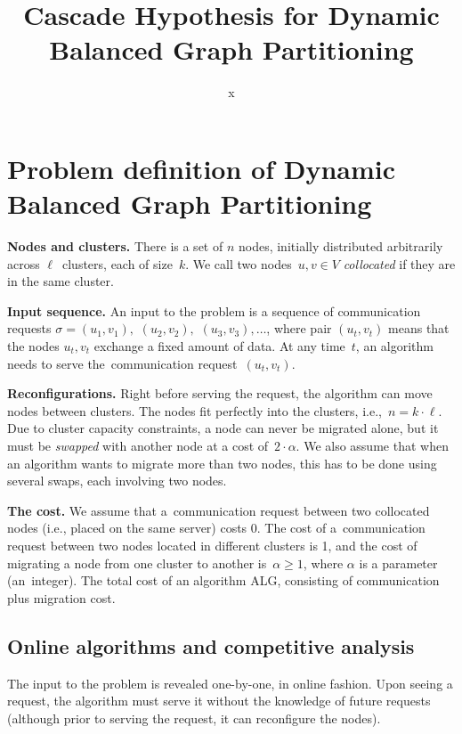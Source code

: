 \documentclass[a4paper,USenglish]{lipics-v2019}
\title{Cascade Hypothesis for Dynamic Balanced Graph Partitioning}
\author{x}{y}{}{}{}
\newcommand{\ALG}{\textsf{ALG}\xspace}
\begin{document}
\maketitle

\section{Problem definition of Dynamic Balanced Graph Partitioning}


\noindent
\textbf{Nodes and clusters.} There is a set of $n$ nodes, initially distributed arbitrarily
across $\ell$~clusters, each of size~$k$. We call two nodes~$u,v\in V$
\emph{collocated} if they are in the same cluster.

\noindent
\textbf{Input sequence.} An input to the problem is a sequence of communication requests $\sigma =
(u_1,v_1),$ $(u_2,v_2),$ $(u_3,v_3), \ldots$, where pair $(u_t,v_t)$ means that
the nodes $u_t,v_t$ exchange a fixed amount of data. At any time~$t
$, an algorithm needs to serve the~communication
request~$(u_t,v_t)$.


\noindent
\textbf{Reconfigurations.} Right before serving the request, the algorithm
can move nodes between clusters.
The nodes fit perfectly into the clusters,
i.e.,~$n=k\cdot \ell$. Due to cluster capacity
constraints, a node can never be migrated alone, but it must be \emph{swapped}
with another node at a cost of~$2 \cdot \alpha$. We also assume that when an
algorithm wants to migrate more than two nodes, this has to be done using
several swaps, each involving two nodes.

\noindent
\textbf{The cost.} We assume that
a~communication request between two collocated nodes (i.e., placed on the same
server) costs 0. The cost of a~communication request between two nodes located in different clusters is
1, and the cost of migrating a node from one cluster to another
is~$\alpha \geq 1$, where $\alpha$ is a parameter (an~integer). 
The total cost of an algorithm \ALG, consisting of communication plus migration
cost.

\subsection{Online algorithms and competitive analysis}

The input to the problem is revealed one-by-one, in online fashion. Upon seeing
a request, the algorithm must serve it without the knowledge of future requests
(although prior to serving the request, it can reconfigure the nodes).
\end{document}
